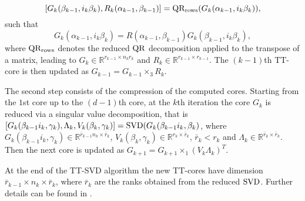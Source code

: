 \documentclass{siamart190516}
\newcommand{\cc}[1]{\mathcal{#1}}
\newcommand{\bb}[1]{\mathbb{#1}}
\newcommand{\cA}{\cc A}
\begin{document}
\[
[G_k(\beta_{k-1},i_k \beta_k), R_k(\alpha_{k-1},\beta_{k-1})] = {\rm QR_{rows}}(G_k(\alpha_{k-1}, i_k \beta_k)),
\]
such that
\[
G_k(\alpha_{k-1}, i_k \beta_k) = R(\alpha_{k-1}, \beta_{k-1}) G_k(\beta_{k-1}, i_k \beta_k),
\]
where ${\rm QR_{rows}}$ denotes the reduced ${\rm QR}$ decomposition applied to the transpose of a matrix, leading to $G_k\in\bb{R}^{r_{k-1}\times n_k r_k}$ and $R_k\in\bb{R}^{r_{k-1}\times r_{k-1}}$. The $(k-1)$th TT-core is then updated as $G_{k-1} = G_{k-1}\times_3 R_k$.

The second step consists of the compression of the computed cores. Starting from the $1$st core up to the $(d-1)$th core, at the $k$th iteration the core $G_k$ is reduced via a singular value decomposition, that is
%
 $[G_k(\beta_{k-1}i_k, \gamma_k), \Lambda_k, V_k(\beta_k, \gamma_k)] = {\rm SVD}(G_k(\beta_{k-1} i_k, \beta_k)$,
where $G_k(\beta_{k-1}i_k, \gamma_k)\in\bb{R}^{\bar{r}_{k-1}n_k \times \bar{r}_k}$, 
$V_k(\beta_k, \gamma_k) \in \bb{R}^{r_k \times \bar{r}_k}$, $\bar{r}_k < r_k$ and
$\Lambda_k \in \bb{R}^{\bar{r}_k\times \bar{r}_k}$.
Then the next core is updated as $G_{k+1} = G_{k+1} \times_1 (V_k \Lambda_k)^T$. 

At the end of the TT-SVD algorithm the new TT-cores have dimension $\bar{r}_{k-1} \times n_k \times \bar{r}_k$, where $\bar{r}_k$ are the ranks obtained from the reduced ${\rm SVD}$. Further details can be found in \cite{Oseledets.2011}. 





\begin{comment}
we rewrite the unfolding matrix $A_1 = \cA(i_1; i_2,\ldots,i_d)$ as
\[
A_1 = U V^T,
\]
where
\[
U(i_1, \alpha_1) = G_1(i_1,\alpha_1). \hspace{.4cm} V(i_2,i_3,\ldots,i_d;\alpha_1) = G_2(\alpha_1,i_2) G_3(i_3)\cdots G_d(i_d),
\]
where $(i_2,\ldots, i_d)$ is the multi-index related the rows of $V$. We first compute the QR-decompositions of $U$ and $V$,
\[
U = Q_U R_U, \hspace{.4cm} V = Q_V R_V,
\]
and compute the matrix
\[
P = R_U R_V^T,
\]
and reduce it via SVD
\[
P = X D Y^T,
\]
where $D$ is a $\bar{r}\times \bar{r}$
, with $\bar{r} < r$. Than update 
\[
\hat{U} = Q_U X,
\]
\end{comment}
\end{document}
